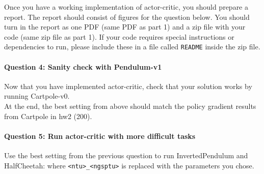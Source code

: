 \documentclass{article}
\begin{document}
Once you have a working implementation of actor-critic, you should prepare a report. The report should consist of figures for the question below. You should turn in the report as one PDF (same PDF as part 1) and a zip file with your code (same zip file as part 1). If your code requires special instructions or dependencies to run, please include these in a file called \verb+README+ inside the zip file.

\paragraph{Question 4: Sanity check with Pendulum-v1}
Now that you have implemented actor-critic, check that your solution works by running Cartpole-v0. \\
At the end, the best setting from above should match the policy gradient results from Cartpole in hw2 (200).

\paragraph{Question 5: Run actor-critic with more difficult tasks}
Use the best setting from the previous question to run InvertedPendulum and HalfCheetah:
where \texttt{<ntu>\_<ngsptu>} is replaced with the parameters you chose.
\end{document}
